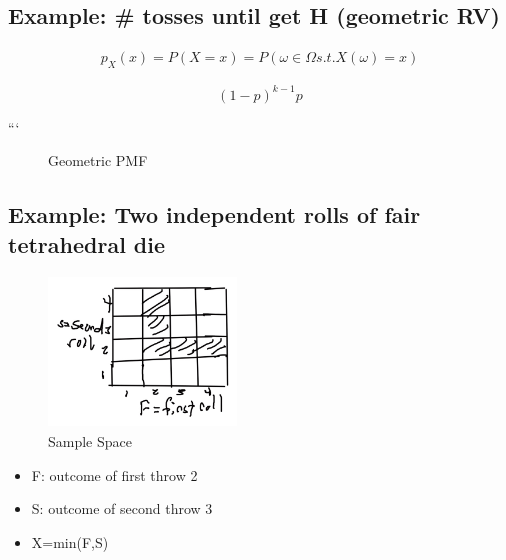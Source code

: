 \documentclass{article}
\begin{document}
\subsection{Example: \# tosses until get H (geometric RV)}

\begin{align*}
    p_X(x)=P(X=x)=P({\omega \in \Omega s.t. X(\omega)=x})
\end{align*}


$$(1-p)^{k-1}p$$

```

\edef\mylst{"p","p(1-p)"}

\begin{figure}[h]
\centering

\caption{Geometric PMF}
\end{figure}

\subsection{Example: Two independent rolls of fair tetrahedral die}


\begin{figure}[h]
\centering
\includegraphics[width=5cm, height=4cm]{images/L05/min_2die_roll.jpeg}
\caption{Sample Space}
\end{figure}

\begin{itemize}
    \item F: outcome of first throw 2
    \item S: outcome of second throw 3
    \item X=min(F,S)
\end{itemize}
\end{document}
